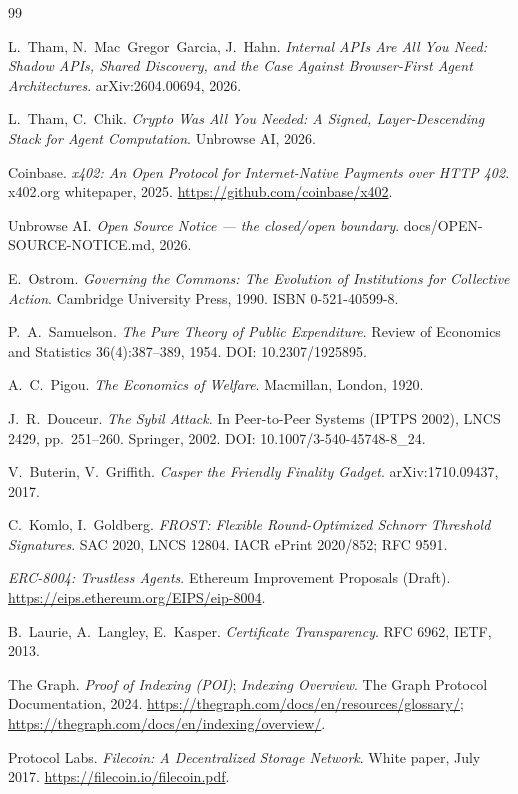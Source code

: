 \documentclass[11pt]{article}
\begin{document}
\begin{thebibliography}{99}

 L.~Tham, N.~Mac~Gregor~Garcia, J.~Hahn. \emph{Internal APIs Are All
You Need: Shadow APIs, Shared Discovery, and the Case Against Browser-First Agent
Architectures}. arXiv:2604.00694, 2026.

 L.~Tham, C.~Chik. \emph{Crypto Was All You Needed: A Signed,
Layer-Descending Stack for Agent Computation}. Unbrowse AI, 2026.

 Coinbase. \emph{x402: An Open Protocol for Internet-Native Payments
over HTTP 402}. x402.org whitepaper, 2025. \url{https://github.com/coinbase/x402}.

 Unbrowse AI. \emph{Open Source Notice --- the closed/open
boundary}. docs/OPEN-SOURCE-NOTICE.md, 2026.

 E.~Ostrom. \emph{Governing the Commons: The Evolution of
Institutions for Collective Action}. Cambridge University Press, 1990. ISBN
0-521-40599-8.

 P.~A.~Samuelson. \emph{The Pure Theory of Public Expenditure}.
Review of Economics and Statistics 36(4):387--389, 1954. DOI: 10.2307/1925895.

 A.~C.~Pigou. \emph{The Economics of Welfare}. Macmillan, London,
1920.

 J.~R.~Douceur. \emph{The Sybil Attack}. In Peer-to-Peer Systems
(IPTPS 2002), LNCS 2429, pp.~251--260. Springer, 2002. DOI:
10.1007/3-540-45748-8\_24.

 V.~Buterin, V.~Griffith. \emph{Casper the Friendly Finality
Gadget}. arXiv:1710.09437, 2017.

 C.~Komlo, I.~Goldberg. \emph{FROST: Flexible Round-Optimized Schnorr
Threshold Signatures}. SAC 2020, LNCS 12804. IACR ePrint 2020/852; RFC 9591.

 \emph{ERC-8004: Trustless Agents}. Ethereum Improvement Proposals
(Draft). \url{https://eips.ethereum.org/EIPS/eip-8004}.

 B.~Laurie, A.~Langley, E.~Kasper. \emph{Certificate Transparency}.
RFC 6962, IETF, 2013.

 The Graph. \emph{Proof of Indexing (POI)}; \emph{Indexing
Overview}. The Graph Protocol Documentation, 2024.
\url{https://thegraph.com/docs/en/resources/glossary/};
\url{https://thegraph.com/docs/en/indexing/overview/}.

 Protocol Labs. \emph{Filecoin: A Decentralized Storage
Network}. White paper, July 2017. \url{https://filecoin.io/filecoin.pdf}.
\end{thebibliography}
\end{document}

